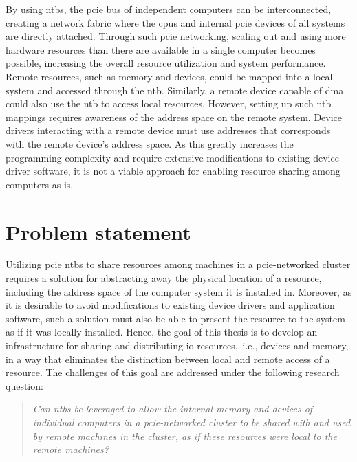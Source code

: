 %

By using \glspl{ntb}, the \gls{pcie} bus of independent computers can be interconnected, creating a network fabric where the \glspl{cpu} and internal \gls{pcie} devices of all systems are directly attached.
%
Through such \gls{pcie} networking, scaling out and using more hardware resources than there are available in a single computer becomes possible, increasing the overall resource utilization and system performance. 
%
Remote resources, such as memory and devices, could be mapped into a local system and accessed through the \gls{ntb}. 
%
Similarly, a remote device capable of \gls{dma} could also use the \gls{ntb} to access local resources. 
%
However, setting up such \gls{ntb} mappings requires awareness of the address space on the remote system.
%
Device drivers interacting with a remote device must use addresses that corresponds with the remote device's address space.
%
As this greatly increases the programming complexity and require extensive modifications to existing device driver software, it is not a viable approach for enabling resource sharing among computers  as is.



\section{Problem statement}\label{sec:objectives}
Utilizing \gls{pcie} \glspl{ntb} to share resources among machines in a \gls{pcie}-networked cluster requires a 
solution for abstracting away the physical location of a resource, including the address space of the computer system it is installed in. Moreover, as it is desirable to avoid modifications to existing device drivers and application software, such a solution must also be able to present the resource to the system as if it was locally installed.
%
Hence, the goal of this thesis is to develop an infrastructure for sharing and distributing \gls{io} resources,~i.e., devices and memory, in a way that eliminates the distinction between local and remote access of a resource. The challenges of this goal are addressed under the following research question: 
\begin{quote}\itshape
    Can \glspl{ntb} be leveraged to allow the internal memory and devices of individual computers in a \gls{pcie}-networked cluster to be shared with and used by remote machines in the cluster, as if these resources were local to the remote machines?
\end{quote}

